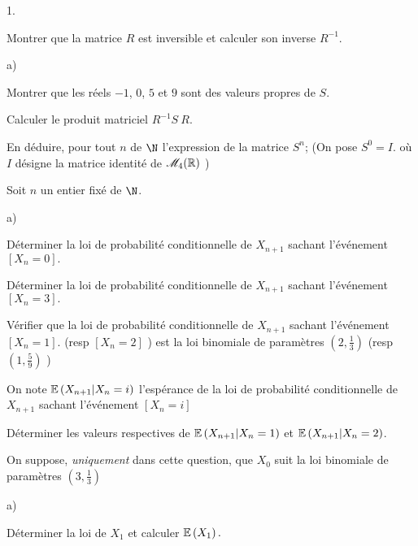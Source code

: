 \documentclass[11pt]{article}%
\begin{document}
\begin{noliste}{1.}
 \setlength{\itemsep}{4mm}
\item Montrer que la matrice $R$ est inversible et calculer son inverse
$R^{-1}.$

\item 
\begin{noliste}{a)}
 \setlength{\itemsep}{2mm}
\item Montrer que les réels $-1$, $0$, $5$ et $9$ sont des valeurs
propres de $S.$

\item Calculer le produit matriciel $R^{-1}S\ R$.

\item En déduire, pour tout $n$ de $\N$ l'expression de la
matrice $S^{n}$; (On pose $S^{0} = I$. où $I$ désigne la matrice
identité de $\mathscr{M}_{4}(\mathbb{R}) $ )
\end{noliste}

\item Soit $n$ un entier fixé de $\N$.

\begin{noliste}{a)}
 \setlength{\itemsep}{2mm}
\item Déterminer la loi de probabilité conditionnelle de $X_{n + 1}$
sachant l'événement $\left[ X_{n} = 0\right].$

\item Déterminer la loi de probabilité conditionnelle de $X_{n + 1}$
sachant l'événement $\left[ X_{n} = 3\right].$

\item Vérifier que la loi de probabilité conditionnelle de $X_{n + 1}$
sachant l'événement $\left[ X_{n} = 1\right].$ (resp $\left[ X_{n} =
2\right] $ ) est la loi binomiale de paramètres $\left(
2,\frac{1}{3}\right) $ (resp \ $\left( 1,\frac{5}{9}\right) $ )

\item On note $\mathbb{E}\left( X_{n + 1}|X_{n} = i\right) $ l'espérance de la
loi de
probabilité conditionnelle de $X_{n + 1}$ sachant l'événement $\left[
X_{n} = i\right] $

Déterminer les valeurs respectives de $\mathbb{E}\left( X_{n + 1}|X_{n} =
1\right) $
et $\mathbb{E}\left( X_{n + 1}|X_{n} = 2\right) $.
\end{noliste}

\item On suppose, \textit{uniquement} dans cette question, que $X_{0}$
suit la loi
binomiale de paramètres $\left( 3,\frac{1}{3}\right) $

\begin{noliste}{a)}
 \setlength{\itemsep}{2mm}
\item Déterminer la loi de $X_{1}$ et calculer $\mathbb{E}\left( X_{1}\right).$


\end{noliste}
\end{noliste}
\end{document}

